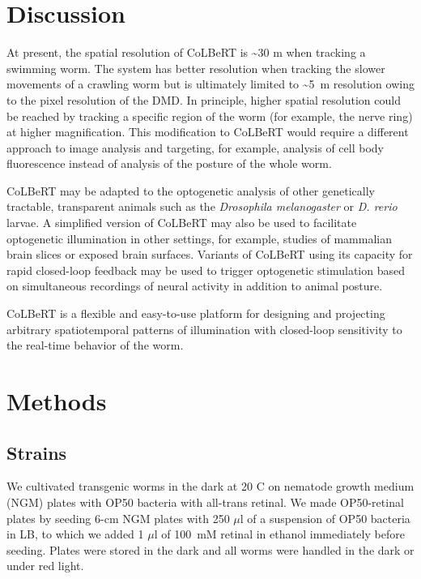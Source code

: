 \section{Discussion}
At present, the spatial resolution of CoLBeRT is \textasciitilde{30} \textmu m when tracking a swimming worm. The system has better resolution when tracking the slower movements of a crawling worm but is ultimately limited to \textasciitilde5~\textmu m resolution owing to the pixel resolution of the DMD. In principle, higher spatial resolution could be reached by tracking a specific region of the worm (for example, the nerve ring) at higher magnification. This modification to CoLBeRT would require a different approach to image analysis and targeting, for example, analysis of cell body fluorescence instead of analysis of the posture of the whole worm.

CoLBeRT may be adapted to the opto\-gen\-etic analysis of other genetic\-ally tract\-able, trans\-parent animals such as the \textit{Drosophila melanogaster} or \textit{D. rerio} larvae. A simplified version of CoLBeRT may also be used to facilitate optogenetic illumination in other settings, for example, studies of mammalian brain slices or exposed brain surfaces. Variants of CoLBeRT using its capacity for rapid closed-loop feedback may be used to trigger optogenetic stimulation based on simultaneous recordings of neural activity in addition to animal posture.

CoLBeRT is a flexible and easy-to-use platform for designing and projecting arbitrary spatiotemporal patterns of illumination with closed-loop sensitivity to the real-time behavior of the worm.

\section{Methods}
\subsection{Strains}
We cultivated transgenic worms in the dark at 20 \textdegree C on nematode growth medium (NGM) plates with OP50 bacteria with all-trans retinal. We made OP50-retinal plates by seeding 6-cm NGM plates with 250 $\mu$l of a suspension of OP50 bacteria in LB, to which we added 1 $\mu$l of 100~mM retinal in ethanol immediately before seeding. Plates were stored in the dark and all worms were handled in the dark or under red light.


